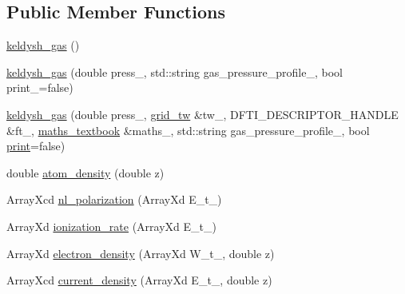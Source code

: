 \subsection*{Public Member Functions}
\begin{DoxyCompactItemize}
\item 
\mbox{\hyperlink{classkeldysh__gas_a25e559700c04e93efb560db511adbe72}{keldysh\+\_\+gas}} ()
\item 
\mbox{\hyperlink{classkeldysh__gas_a457eec01f8cb23665d6a24c343b29571}{keldysh\+\_\+gas}} (double press\+\_\+, std\+::string gas\+\_\+pressure\+\_\+profile\+\_\+, bool print\+\_\+=false)
\item 
\mbox{\hyperlink{classkeldysh__gas_ac986b9e64f1ce288ad0dfb7bdb00e844}{keldysh\+\_\+gas}} (double press\+\_\+, \mbox{\hyperlink{classgrid__tw}{grid\+\_\+tw}} \&tw\+\_\+, D\+F\+T\+I\+\_\+\+D\+E\+S\+C\+R\+I\+P\+T\+O\+R\+\_\+\+H\+A\+N\+D\+LE \&ft\+\_\+, \mbox{\hyperlink{classmaths__textbook}{maths\+\_\+textbook}} \&maths\+\_\+, std\+::string gas\+\_\+pressure\+\_\+profile\+\_\+, bool \mbox{\hyperlink{classkeldysh__gas_a6c8f0e275da16bbf21f51a8c2a444bf7}{print}}=false)
\item 
double \mbox{\hyperlink{classkeldysh__gas_acfa0604a6f00bce28b72b9a07fb79314}{atom\+\_\+density}} (double z)
\item 
Array\+Xcd \mbox{\hyperlink{classkeldysh__gas_a1cd65d1983cb6c5ff9d04eeb29e94dd5}{nl\+\_\+polarization}} (Array\+Xd E\+\_\+t\+\_\+)
\item 
Array\+Xd \mbox{\hyperlink{classkeldysh__gas_a42dc79816adcae9c25499baa7256ec10}{ionization\+\_\+rate}} (Array\+Xd E\+\_\+t\+\_\+)
\item 
Array\+Xd \mbox{\hyperlink{classkeldysh__gas_a8dddacdfabea4d6c3049088cc868715a}{electron\+\_\+density}} (Array\+Xd W\+\_\+t\+\_\+, double z)
\item 
Array\+Xcd \mbox{\hyperlink{classkeldysh__gas_a7d5f16951d622544d814518a37768411}{current\+\_\+density}} (Array\+Xd E\+\_\+t\+\_\+, double z)
\end{DoxyCompactItemize}
